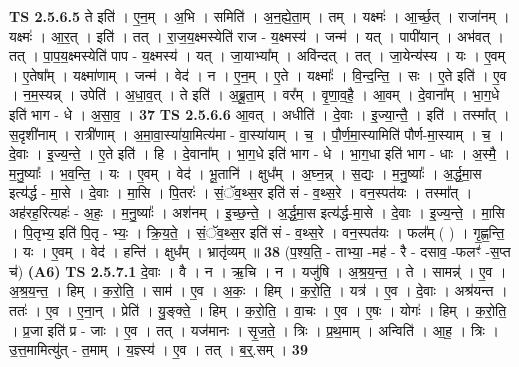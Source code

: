\documentclass[17pt]{extarticle}
\begin{document}
                  \newline
                                \textbf{ TS 2.5.6.5} \newline
                  ते इति॑ । ए॒न॒म् । अ॒भि । समिति॑ । अ॒न॒ह्ये॒ता॒म् । तम् । यक्ष्मः॑ । आ॒र्च्छ॒त् । राजा॑नम् । यक्ष्मः॑ । आ॒र॒त् । इति॑ । तत् । रा॒ज॒य॒क्ष्मस्येति॑ राज - य॒क्ष्मस्य॑ । जन्म॑ । यत् । पापी॑यान् । अभ॑वत् । तत् । पा॒प॒य॒क्ष्मस्येति॑ पाप - य॒क्ष्मस्य॑ । यत् । जा॒याभ्या᳚म् । अवि॑न्दत् । तत् । जा॒येन्य॑स्य । यः । ए॒वम् । ए॒तेषा᳚म् । यक्ष्मा॑णाम् । जन्म॑ । वेद॑ । न । ए॒न॒म् । ए॒ते । यक्ष्माः᳚ । वि॒न्द॒न्ति॒ । सः । ए॒ते इति॑ । ए॒व । न॒म॒स्यन्न् । उपेति॑ । अ॒धा॒व॒त् । ते इति॑ । अ॒ब्रू॒ता॒म् । वर᳚म् । वृ॒णा॒व॒है॒ । आ॒वम् । दे॒वाना᳚म् । भा॒ग॒धे इति॑ भाग - धे । अ॒सा॒व॒ । \textbf{  37} \newline
                  \newline
                                \textbf{ TS 2.5.6.6} \newline
                  आ॒वत् । अधीति॑ । दे॒वाः । इ॒ज्या॒न्तै॒ । इति॑ । तस्मा᳚त् । स॒दृशी॑नाम् । रात्री॑णाम् । अ॒मा॒वा॒स्या॑या॒मित्य॑मा - वा॒स्या॑याम् । च॒ । पौ॒र्ण॒मा॒स्यामिति॑ पौर्ण-मा॒स्याम् । च॒ । दे॒वाः । इ॒ज्य॒न्ते॒ । ए॒ते इति॑ । हि । दे॒वाना᳚म् । भा॒ग॒धे इति॑ भाग - धे । भा॒ग॒धा इति॑ भाग - धाः । अ॒स्मै॒ । म॒नु॒ष्याः᳚ । भ॒व॒न्ति॒ । यः । ए॒वम् । वेद॑ । भू॒तानि॑ । क्षुध᳚म् । अ॒घ्न॒न्न् । स॒द्यः । म॒नु॒ष्याः᳚ । अ॒र्द्ध॒मा॒स इत्य॑र्द्ध - मा॒से । दे॒वाः । मा॒सि । पि॒तरः॑ । सं॒ॅव॒थ्स॒र इति॑ सं - व॒थ्स॒रे । वन॒स्पत॑यः । तस्मा᳚त् । अह॑रह॒रित्यहः॑ - अ॒हः॒ । म॒नु॒ष्याः᳚ । अश॑नम् । इ॒च्छ॒न्ते॒ । अ॒र्द्ध॒मा॒स इत्य॑र्द्ध-मा॒से । दे॒वाः । इ॒ज्य॒न्ते॒ । मा॒सि । पि॒तृभ्य॒ इति॑ पि॒तृ - भ्यः॒ । क्रि॒य॒ते॒ । सं॒ॅव॒थ्स॒र इति॑ सं - व॒थ्स॒रे । वन॒स्पत॑यः । फल᳚म् ( ) । गृ॒ह्ण॒न्ति॒ । यः । ए॒वम् । वेद॑ । हन्ति॑ । क्षुध᳚म् । भ्रातृ॑व्यम् ॥ \textbf{  38 } \newline
                  \newline
                      (प॒श्य॒ति॒ - ताभ्या॒ -मह॑ - रै - दसाव॒ -फलꣳ॑ -स॒प्त च॑)  \textbf{(A6)} \newline \newline
                                \textbf{ TS 2.5.7.1} \newline
                  दे॒वाः । वै । न । ऋ॒चि । न । यजु॑षि । अ॒श्र॒य॒न्त॒ । ते । सामन्न्॑ । ए॒व । अ॒श्र॒य॒न्त॒ । हिम् । क॒रो॒ति॒ । साम॑ । ए॒व । अ॒कः॒ । हिम् । क॒रो॒ति॒ । यत्र॑ । ए॒व । दे॒वाः । अश्र॑यन्त । ततः॑ । ए॒व । ए॒ना॒न् । प्रेति॑ । यु॒ङ्क्ते॒ । हिम् । क॒रो॒ति॒ । वा॒चः । ए॒व । ए॒षः । योगः॑ । हिम् । क॒रो॒ति॒ । प्र॒जा इति॑ प्र - जाः । ए॒व । तत् । यज॑मानः । सृ॒ज॒ते॒ । त्रिः । प्र॒थ॒माम् । अन्विति॑ । आ॒ह॒ । त्रिः । उ॒त्त॒मामित्यु॑त् - त॒माम् । य॒ज्ञ्स्य॑ । ए॒व । तत् । ब॒र्॒.सम् । \textbf{  39} \newline
\end{document}
